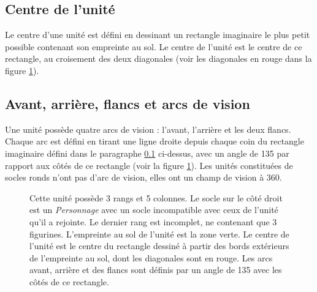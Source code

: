 \subsection{Centre de l'unité}
\label{centre_unite}

Le centre d'une unité est défini en dessinant un rectangle imaginaire le plus petit possible contenant son empreinte au sol. Le centre de l'unité est le centre de ce rectangle, au croisement des deux diagonales (voir les diagonales en rouge dans la figure \ref{figure/arcs}).

\subsection{Avant, arrière, flancs et arcs de vision}

Une unité possède quatre arcs de vision : l'avant, l'arrière et les deux flancs. Chaque arc est défini en tirant une ligne droite depuis chaque coin du rectangle imaginaire défini dans le paragraphe \ref{centre_unite} ci-dessus, avec un angle de 135{\text{\degree}} par rapport aux côtés de ce rectangle (voir la figure \ref{figure/arcs}). Les unités constituées de socles ronds n'ont pas d'arc de vision, elles ont un champ de vision à 360{\text{\degree}}.

\begin{figure}[!htbp]
\centering
\def\svgwidth{12cm}

\caption{Cette unité possède 3 rangs et 5 colonnes. Le socle sur le côté droit est un \emph{Personnage} avec un socle incompatible avec ceux de l'unité qu'il a rejointe. Le dernier rang est incomplet, ne contenant que 3 figurines. L'empreinte au sol de l'unité est la zone verte. Le centre de l'unité est le centre du rectangle dessiné à partir des bords extérieurs de l'empreinte au sol, dont les diagonales sont en rouge. Les arcs avant, arrière et des flancs sont définis par un angle de 135{\text{\degree}} avec les côtés de ce rectangle.}
\label{figure/arcs}
\end{figure}
